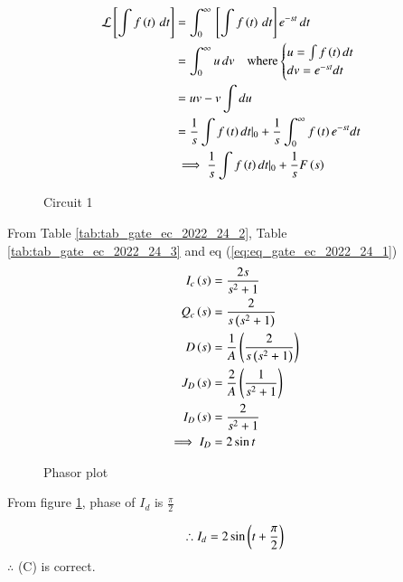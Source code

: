 \documentclass[journal,12pt,twocolumn]{IEEEtran}
\begin{document}
\begin{align}
    \mathcal{L}{}\left[\int f\left(t\right)\, dt\right] &= \int_{0}^{\infty}{}\left[\int f\left(t\right)\, dt\right]e^{-st}\, dt\\
    &= \int_{0}^{\infty}u\, dv \quad \text{where}\begin{cases}
  u =\int f\left(t\right)dt \\
  dv  =e^{-st}dt
\end{cases}\\
&= uv - v\int du\\
&= \frac{1}{s}\int f\left(t\right)dt|_0 + \frac{1}{s}\int_{0}^{\infty}f\left(t\right)e^{-st}dt\\
&\implies \frac{1}{s}\int f\left(t\right)dt|_0 + \frac{1}{s}F\left(s\right) \label{eq:eq_gate_ec_2022_24_1}
\end{align}


\begin{figure}[ht]
  \centering
      
  \caption{Circuit 1}
\end{figure}

From Table \ref{tab:tab_gate_ec_2022_24_2}, Table \ref{tab:tab_gate_ec_2022_24_3} and eq (\ref{eq:eq_gate_ec_2022_24_1})
\begin{align}
    I_c\left(s\right) &= \frac{2s}{s^2 + 1}\\
    Q_c\left(s\right) &= \frac{2}{s\left(s^2 + 1\right)}\\
    D\left(s\right) &= \frac{1}{A}\left(\frac{2}{s\left(s^2 + 1\right)}\right)\\
    J_D\left(s\right) &= \frac{2}{A}\left(\frac{1}{s^2 + 1}\right)\\
    I_D\left(s\right) &= \frac{2}{s^2 + 1}\\
    \implies I_D &= 2\sin{t}
\end{align}


\begin{figure}[ht]
  \centering
      
  \caption{Phasor plot}
  \label{fig:fig_gate_ec_2022_24_1}
\end{figure}

From figure \ref{fig:fig_gate_ec_2022_24_1}, phase of $I_d$ is $\frac{\pi}{2}$

\begin{align}
    \therefore I_d = 2\sin\left(t + \frac{\pi}{2}\right)
\end{align}
$\therefore$ (C) is correct.
\end{document}
